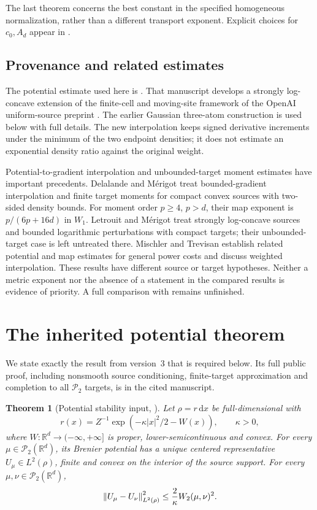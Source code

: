 \documentclass[11pt]{article}
\numberwithin{equation}{section}
\newtheorem{theorem}{Theorem}[section]
\theoremstyle{remark}\newtheorem{remark}[theorem]{Remark}
\newcommand{\R}{\mathbb R}\newcommand{\E}{\mathbb E}
\newcommand{\Prob}{\mathcal P}\newcommand{\dd}{\,\mathrm d}
\begin{document}
The last theorem concerns the best constant in the specified homogeneous normalization, rather than a different transport exponent. Explicit choices for $c_0,A_d$ appear in .

\subsection{Provenance and related estimates}
The potential estimate used here is \cite[Theorem~1.1]{ManuscriptV3}. That manuscript develops a strongly log-concave extension of the finite-cell and moving-site framework of the OpenAI uniform-source preprint \cite{OpenAI2026}. The earlier Gaussian three-atom construction is used below with full details. The new interpolation keeps signed derivative increments under the minimum of the two endpoint densities; it does not estimate an exponential density ratio against the original weight.

Potential-to-gradient interpolation and unbounded-target moment estimates have important precedents. Delalande and M\'erigot \cite[Proposition~4.1 and Corollary~4.4]{DelalandeMerigot2023} treat bounded-gradient interpolation and finite target moments for compact convex sources with two-sided density bounds. For moment order $p\ge4$, $p>d$, their map exponent is $p/(6p+16d)$ in $W_1$. Letrouit and M\'erigot \cite[Theorem~1.4 and Remark~1.5]{LetrouitMerigot2026} treat strongly log-concave sources and bounded logarithmic perturbations with compact targets; their unbounded-target case is left untreated there. Mischler and Trevisan \cite{MischlerTrevisan2026} establish related potential and map estimates for general power costs and discuss weighted interpolation. These results have different source or target hypotheses. Neither a metric exponent nor the absence of a statement in the compared results is evidence of priority. A full comparison with \cite{Merigot2026} remains unfinished.

\section{The inherited potential theorem}\label{sec:input}
We state exactly the result from version~3 that is required below. Its full public proof, including nonsmooth source conditioning, finite-target approximation and completion to all $\Prob_2$ targets, is in the cited manuscript.

\begin{theorem}[Potential stability input, {\cite[Theorem~1.1]{ManuscriptV3}}]\label{thm:input}
Let $\rho=r\dd x$ be full-dimensional with
\[
 r(x)=Z^{-1}\exp(-\kappa|x|^2/2-W(x)),\qquad \kappa>0,
\]
where $W:\R^d\to(-\infty,+\infty]$ is proper, lower-semicontinuous and convex. For every $\mu\in\Prob_2(\R^d)$, its Brenier potential has a unique centered representative $U_\mu\in L^2(\rho)$, finite and convex on the interior of the source support. For every $\mu,\nu\in\Prob_2(\R^d)$,
\begin{equation}\label{eq:potential-input}
 \left\lVert U_\mu-U_\nu\right\rVert_{L^2(\rho)}^2
 \le\frac2\kappa W_2(\mu,\nu)^2.
\end{equation}
\end{theorem}
\end{document}
